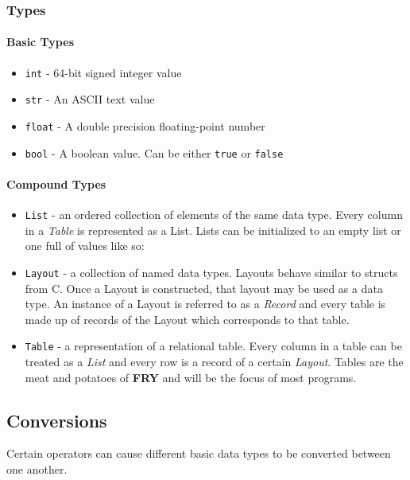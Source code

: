 \documentclass{article}
\begin{document}
\subsubsection{Types}
\label{sec:types}
\paragraph{Basic Types}
\label{sec:prims}
\begin{itemize}
\item \texttt{int} - 64-bit signed integer value
\item \texttt{str} - An ASCII text value
\item \texttt{float} - A double precision floating-point number
\item \texttt{bool} - A boolean value. Can be either \texttt{true} or \texttt{false}
\end{itemize}

\paragraph{Compound Types}

\begin{itemize} 

\item \texttt{List} - an ordered collection of elements of the same data type. Every column in a \emph{Table} is represented as a List. Lists can be initialized to an empty list or one full of values like so:

\item \texttt{Layout} - a collection of named data types. Layouts behave similar to structs from C. Once a Layout is constructed, that layout may be used as a data type.  An instance of a Layout is referred to as a \emph{Record} and every table is made up of records of the Layout which corresponds to that table.

\item \texttt{Table} - a representation of a relational table. Every column in a table can be treated as a \emph{List} and every row is a record of a certain \emph{Layout}. Tables are the meat and potatoes of \textbf{FRY} and will be the focus of most programs.

\end{itemize}

\subsection{Conversions}
Certain operators can cause different basic data types to be converted between one another.
\end{document}
